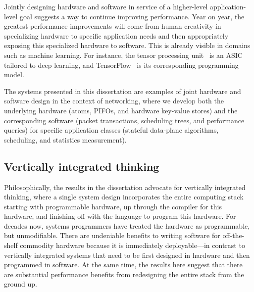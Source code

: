 Jointly designing hardware and software in service of a higher-level
application-level goal suggests a way to continue improving performance. Year
on year, the greatest performance improvements will come from human creativity
in specializing hardware to specific application needs and then appropriately
exposing this specialized hardware to software. This is already visible in
domains such as machine learning. For instance, the tensor processing
unit~\cite{tpu} is an ASIC tailored to deep learning, and
TensorFlow~\cite{tensorflow} is its corresponding programming model.

The systems presented in this dissertation are examples of joint hardware and
software design in the context of networking, where we develop both the
underlying hardware (atoms, PIFOs, and hardware key-value stores) and the
corresponding software (packet transactions, scheduling trees, and performance
queries) for specific application classes (stateful data-plane algorithms,
scheduling, and statistics measurement).

\subsection{Vertically integrated thinking} Philosophically, the results in the
dissertation advocate for vertically integrated thinking, where a single system
design incorporates the entire computing stack starting with programmable
hardware, up through the compiler for this hardware, and finishing off with the
language to program this hardware. For decades now, systems programmers have
treated the hardware as programmable, but unmodifiable. There are undeniable
benefits to writing software for off-the-shelf commodity hardware because it is
immediately deployable---in contrast to vertically integrated systems that need
to be first designed in hardware and then programmed in software. At the same
time, the results here suggest that there are substantial performance benefits
from redesigning the entire stack from the ground up.
